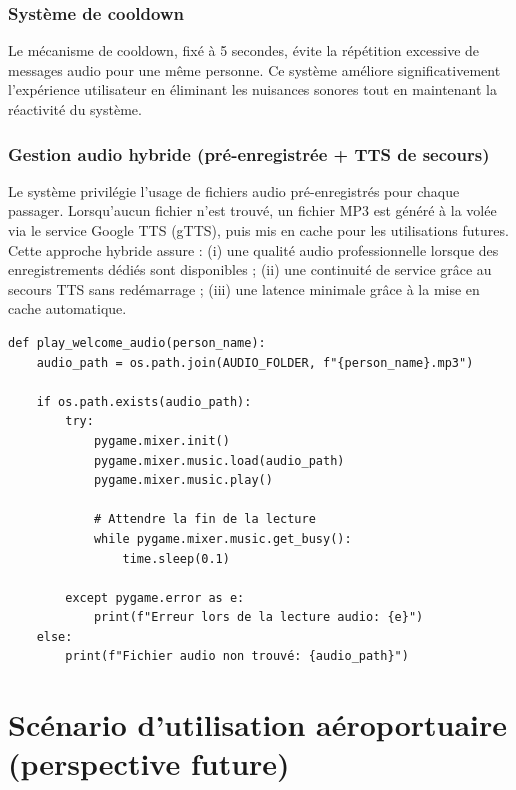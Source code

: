 \documentclass[12pt,a4paper]{article}
\begin{document}
\subsubsection{Système de cooldown}

Le mécanisme de cooldown, fixé à 5 secondes, évite la répétition excessive de messages audio pour une même personne. Ce système améliore significativement l'expérience utilisateur en éliminant les nuisances sonores tout en maintenant la réactivité du système.

\subsubsection{Gestion audio hybride (pré-enregistrée + TTS de secours)}

Le système privilégie l'usage de fichiers audio pré-enregistrés pour chaque passager. Lorsqu'aucun fichier n'est trouvé, un fichier MP3 est généré à la volée via le service Google TTS (gTTS), puis mis en cache pour les utilisations futures. Cette approche hybride assure : (i) une qualité audio professionnelle lorsque des enregistrements dédiés sont disponibles ; (ii) une continuité de service grâce au secours TTS sans redémarrage ; (iii) une latence minimale grâce à la mise en cache automatique.

\begin{lstlisting}[caption=Fonction de lecture audio]
def play_welcome_audio(person_name):
    audio_path = os.path.join(AUDIO_FOLDER, f"{person_name}.mp3")
    
    if os.path.exists(audio_path):
        try:
            pygame.mixer.init()
            pygame.mixer.music.load(audio_path)
            pygame.mixer.music.play()
            
            # Attendre la fin de la lecture
            while pygame.mixer.music.get_busy():
                time.sleep(0.1)
                
        except pygame.error as e:
            print(f"Erreur lors de la lecture audio: {e}")
    else:
        print(f"Fichier audio non trouvé: {audio_path}")
\end{lstlisting}

\newpage

\section{Scénario d'utilisation aéroportuaire \\ (perspective future)}
\end{document}
